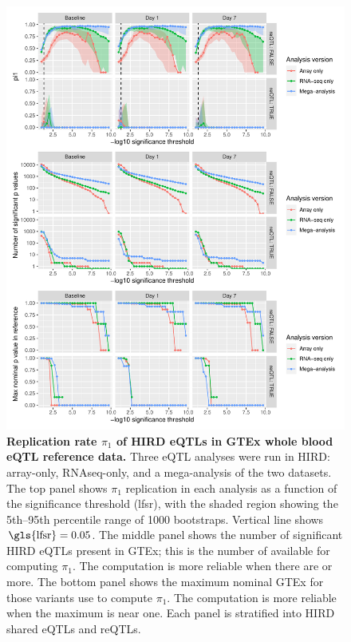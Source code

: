 \begin{figure}
    \centering
    \includegraphics[width=1.0\textwidth,page=1]{mainmatter/figures/chapter_03/compute_pi1.pi1_by_thresholds.pdf}
    \caption{
        \textbf{
            Replication rate $\pi_1$ of \gls{HIRD} \glspl{eQTL} in GTEx whole blood \gls{eQTL} reference data.
        }
        Three \gls{eQTL} analyses were run in \gls{HIRD}: array-only, \gls{RNAseq}-only, and a mega-analysis of the two datasets.
        The top panel shows $\pi_1$ replication in each analysis as a function of the significance threshold (\gls{lfsr}), with the shaded region showing the 5th--95th percentile range of 1000 bootstraps.
        Vertical line shows $\text{\gls{lfsr}} = 0.05$.
        The middle panel shows the number of significant \gls{HIRD} \glspl{eQTL} present in GTEx; this is the number of \pvalues{} available for computing $\pi_1$.
        The computation is more reliable when there are  or more.
        The bottom panel shows the maximum nominal GTEx \pvalue{} for those variants use to compute $\pi_1$.
        The computation is more reliable when the maximum is near one.
        Each panel is stratified into \gls{HIRD} shared \glspl{eQTL} and \glspl{reQTL}.
    }
    \label{fig:hird_reQTL_pi1vsGTExWholeBlood}
\end{figure}

